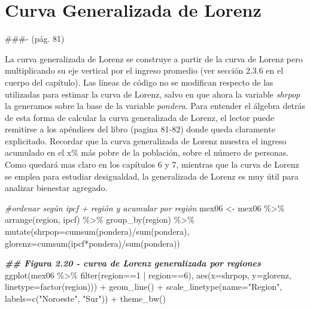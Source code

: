 \documentclass[
]{book}
\newenvironment{Shaded}{\begin{snugshade}}{\end{snugshade}}
\newcommand{\AttributeTok}[1]{\textcolor[rgb]{0.77,0.63,0.00}{#1}}
\newcommand{\CommentTok}[1]{\textcolor[rgb]{0.56,0.35,0.01}{\textit{#1}}}
\newcommand{\DecValTok}[1]{\textcolor[rgb]{0.00,0.00,0.81}{#1}}
\newcommand{\DocumentationTok}[1]{\textcolor[rgb]{0.56,0.35,0.01}{\textbf{\textit{#1}}}}
\newcommand{\FunctionTok}[1]{\textcolor[rgb]{0.00,0.00,0.00}{#1}}
\newcommand{\NormalTok}[1]{#1}
\newcommand{\OtherTok}[1]{\textcolor[rgb]{0.56,0.35,0.01}{#1}}
\newcommand{\SpecialCharTok}[1]{\textcolor[rgb]{0.00,0.00,0.00}{#1}}
\newcommand{\StringTok}[1]{\textcolor[rgb]{0.31,0.60,0.02}{#1}}
\begin{document}
\hypertarget{curva-generalizada-de-lorenz}{%
\section{Curva Generalizada de Lorenz}\label{curva-generalizada-de-lorenz}}

\#\#\#- (pág. 81)

La curva generalizada de Lorenz se construye a partir de la curva de Lorenz pero multiplicando su eje vertical por el ingreso promedio (ver sección 2.3.6 en el cuerpo del capítulo). Las líneas de código no se modifican respecto de las utilizadas para estimar la curva de Lorenz, salvo en que ahora la variable \emph{shrpop} la generamos sobre la base de la variable \emph{pondera}. Para entender el álgebra detrás de esta forma de calcular la curva generalizada de Lorenz, el lector puede remitirse a los apéndices del libro (pagina 81-82) donde queda claramente explicitado. Recordar que la curva generalizada de Lorenz muestra el ingreso acumulado en el x\% más pobre de la población, sobre el número de personas. Como quedará mas claro en los capítulos 6 y 7, mientras que la curva de Lorenz se emplea para estudiar desigualdad, la generalizada de Lorenz es muy útil para analizar bienestar agregado.

\begin{Shaded}
\begin{Highlighting}[]
\CommentTok{\#ordenar según ipcf + región y acumular por región}
\NormalTok{mex06 }\OtherTok{\textless{}{-}}\NormalTok{ mex06 }\SpecialCharTok{\%\textgreater{}\%} \FunctionTok{arrange}\NormalTok{(region, ipcf) }\SpecialCharTok{\%\textgreater{}\%} 
                   \FunctionTok{group\_by}\NormalTok{(region) }\SpecialCharTok{\%\textgreater{}\%} 
                   \FunctionTok{mutate}\NormalTok{(}\AttributeTok{shrpop=}\FunctionTok{cumsum}\NormalTok{(pondera)}\SpecialCharTok{/}\FunctionTok{sum}\NormalTok{(pondera),}
                          \AttributeTok{glorenz=}\FunctionTok{cumsum}\NormalTok{(ipcf}\SpecialCharTok{*}\NormalTok{pondera)}\SpecialCharTok{/}\FunctionTok{sum}\NormalTok{(pondera)) }

\DocumentationTok{\#\# Figura 2.20 {-} curva de Lorenz generalizada por regiones}
\FunctionTok{ggplot}\NormalTok{(mex06 }\SpecialCharTok{\%\textgreater{}\%} \FunctionTok{filter}\NormalTok{(region}\SpecialCharTok{==}\DecValTok{1} \SpecialCharTok{|}\NormalTok{ region}\SpecialCharTok{==}\DecValTok{6}\NormalTok{),}
       \FunctionTok{aes}\NormalTok{(}\AttributeTok{x=}\NormalTok{shrpop, }\AttributeTok{y=}\NormalTok{glorenz, }\AttributeTok{linetype=}\FunctionTok{factor}\NormalTok{(region))) }\SpecialCharTok{+}
  \FunctionTok{geom\_line}\NormalTok{() }\SpecialCharTok{+}
  \FunctionTok{scale\_linetype}\NormalTok{(}\AttributeTok{name=}\StringTok{"Region"}\NormalTok{, }\AttributeTok{labels=}\FunctionTok{c}\NormalTok{(}\StringTok{"Noroeste"}\NormalTok{, }\StringTok{"Sur"}\NormalTok{)) }\SpecialCharTok{+}
  \FunctionTok{theme\_bw}\NormalTok{()}
\end{Highlighting}
\end{Shaded}
\end{document}
